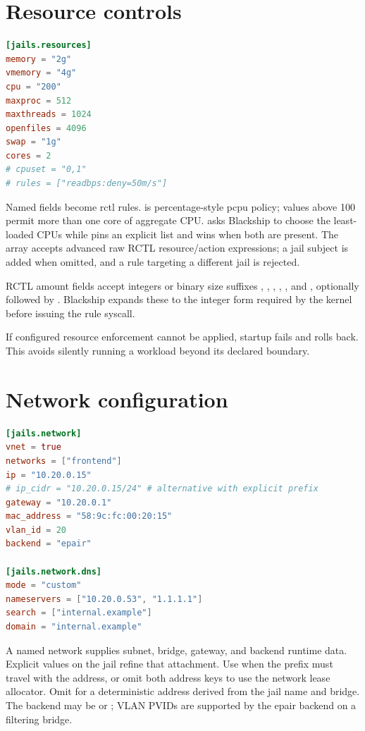 \section{Resource controls}

\begin{lstlisting}[language=TOML]
[jails.resources]
memory = "2g"
vmemory = "4g"
cpu = "200"
maxproc = 512
maxthreads = 1024
openfiles = 4096
swap = "1g"
cores = 2
# cpuset = "0,1"
# rules = ["readbps:deny=50m/s"]
\end{lstlisting}

Named fields become rctl rules.  is percentage-style pcpu policy;
values above 100 permit more than one core of aggregate CPU. 
asks Blackship to choose the least-loaded CPUs while  pins an
explicit list and wins when both are present. The  array accepts
advanced raw RCTL resource/action expressions; a jail subject is added when
omitted, and a rule targeting a different jail is rejected.

RCTL amount fields accept integers or binary size suffixes
, , , , , and
, optionally followed by . Blackship expands these to
the integer form required by the kernel before issuing the rule syscall.

If configured resource enforcement cannot be applied, startup fails and rolls
back. This avoids silently running a workload beyond its declared boundary.

\section{Network configuration}

\begin{lstlisting}[language=TOML]
[jails.network]
vnet = true
networks = ["frontend"]
ip = "10.20.0.15"
# ip_cidr = "10.20.0.15/24" # alternative with explicit prefix
gateway = "10.20.0.1"
mac_address = "58:9c:fc:00:20:15"
vlan_id = 20
backend = "epair"

[jails.network.dns]
mode = "custom"
nameservers = ["10.20.0.53", "1.1.1.1"]
search = ["internal.example"]
domain = "internal.example"
\end{lstlisting}

A named network supplies subnet, bridge, gateway, and backend runtime data.
Explicit values on the jail refine that attachment. Use 
when the prefix must travel with the address, or omit both address keys to use
the network lease allocator. Omit  for a deterministic
address derived from the jail name and bridge. The backend may be
 or ; VLAN PVIDs are supported by the epair
backend on a filtering bridge.

